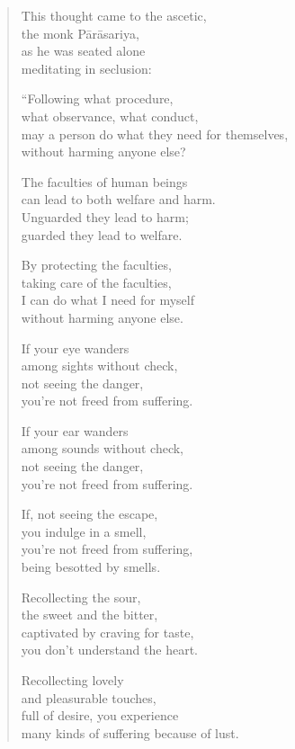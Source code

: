 \documentclass[12pt,openany]{book}%
\begin{document}
\begin{verse}%
This thought came to the ascetic, \\
the monk \textsanskrit{Pārāsariya}, \\
as he was seated alone \\
meditating in seclusion: 

“Following what procedure, \\
what observance, what conduct, \\
may a person do what they need for themselves, \\
without harming anyone else? 

The faculties of human beings \\
can lead to both welfare and harm. \\
Unguarded they lead to harm; \\
guarded they lead to welfare. 

By protecting the faculties, \\
taking care of the faculties, \\
I can do what I need for myself \\
without harming anyone else. 

If your eye wanders \\
among sights without check, \\
not seeing the danger, \\
you’re not freed from suffering. 

If your ear wanders \\
among sounds without check, \\
not seeing the danger, \\
you’re not freed from suffering. 

If, not seeing the escape, \\
you indulge in a smell, \\
you’re not freed from suffering, \\
being besotted by smells. 

Recollecting the sour, \\
the sweet and the bitter, \\
captivated by craving for taste, \\
you don’t understand the heart. 

Recollecting lovely \\
and pleasurable touches, \\
full of desire, you experience \\
many kinds of suffering because of lust. 


\end{verse}
\end{document}
